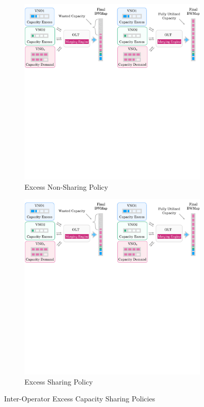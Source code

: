 \begin{figure}%
\centering
\begin{subfigure}{0.48\columnwidth}
 \includegraphics[width=\textwidth]{Figures/non-sharing.pdf}
\caption{Excess Non-Sharing Policy}%
\label{nonsharing_p}
\end{subfigure}\hfill%
\begin{subfigure}{0.48\columnwidth}
 \includegraphics[width=\textwidth]{Figures/sharing.pdf}
\caption{Excess Sharing Policy}%
\label{sharing_p}
\end{subfigure}\hfill%
\caption{Inter-Operator Excess Capacity Sharing Policies}
\label{nonsharingvssharing_p}%
\end{figure}

